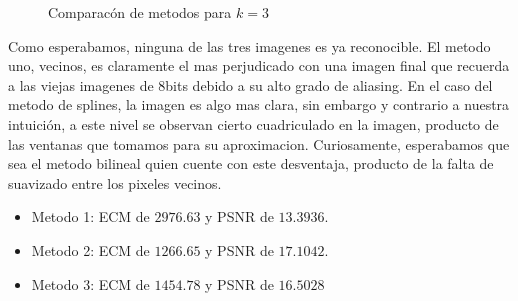 \begin{figure}[H]
    \centering
    \qquad
    \qquad
    \caption{Comparacón de metodos para $k = 3$}%
    \label{fig:example}%
\end{figure}

Como esperabamos, ninguna de las tres imagenes es ya reconocible. El metodo uno, vecinos, es claramente el mas perjudicado con una imagen final que recuerda a las viejas imagenes de 8bits debido a su alto grado de aliasing. En el caso del metodo de splines, la imagen es algo mas clara, sin embargo y contrario a nuestra intuición, a este nivel se observan cierto cuadriculado en la imagen, producto de las ventanas que tomamos para su aproximacion. Curiosamente, esperabamos que sea el metodo bilineal quien cuente con este desventaja, producto de la falta de suavizado entre los pixeles vecinos.
\begin{itemize}
 \item Metodo 1: ECM de $2976.63$ y PSNR de $13.3936$.
 \item Metodo 2: ECM de $1266.65$ y PSNR de $17.1042$.
 \item Metodo 3: ECM de $1454.78$ y PSNR de $16.5028$
\end{itemize}

